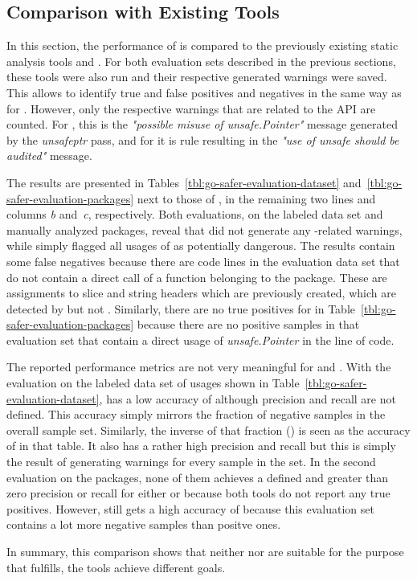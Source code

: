 
\subsection{Comparison with Existing Tools}\label{subsec:go-safer:evaluation:linters-comparison}

In this section, the performance of \toolSafer{} is compared to the previously existing static analysis tools \toolVet{}
and \toolGosec{}.
For both evaluation sets described in the previous sections, these tools were also run and their respective generated
warnings were saved.
This allows to identify true and false positives and negatives in the same way as for \toolSafer{}.
However, only the respective warnings that are related to the \unsafe{} \acrshort{API} are counted.
For \toolVet{}, this is the \textit{"possible misuse of unsafe.Pointer"} message generated by the \textit{unsafeptr}
pass, and for \toolGosec{} it is rule  resulting in the \textit{"use of unsafe should be
audited"} message.

The results are presented in Tables~\ref{tbl:go-safer-evaluation-dataset} and~\ref{tbl:go-safer-evaluation-packages}
next to those of \toolSafer{}, in the remaining two lines and columns \textit{b} and~\textit{c}, respectively.
Both evaluations, on the labeled data set and  manually analyzed packages, reveal that \toolVet{} did not
generate any \unsafe{}-related warnings, while \toolGosec{} simply flagged all usages of \unsafe{} as potentially
dangerous.
The \toolGosec{} results contain some false negatives because there are code lines in the evaluation data set that do
not contain a direct call of a function belonging to the \unsafe{} package.
These are assignments to slice and string headers which are previously created, which are detected by \toolSafer{} but
not \toolGosec{}.
Similarly, there are no true positives for \toolGosec{} in Table~\ref{tbl:go-safer-evaluation-packages} because there
are no positive samples in that evaluation set that contain a direct usage of \textit{unsafe.Pointer} in the line of
code.

The reported performance metrics are not very meaningful for \toolVet{} and \toolGosec{}.
With the evaluation on the labeled data set of \unsafe{} usages shown in Table~\ref{tbl:go-safer-evaluation-dataset},
\toolVet{} has a low accuracy of  although precision and recall are not defined.
This accuracy simply mirrors the fraction of negative samples in the overall sample set.
Similarly, the inverse of that fraction () is seen as the accuracy of \toolGosec{} in that table.
It also has a rather high precision and recall but this is simply the result of generating warnings for every sample in
the set.
In the second evaluation on the  packages, none of them achieves a defined and greater than zero precision
or recall for either \toolVet{} or \toolGosec{} because both tools do not report any true positives.
However, \toolVet{} still gets a high accuracy of  because this evaluation set contains a lot more
negative samples than positve ones.

In summary, this comparison shows that neither \toolVet{} nor \toolGosec{} are suitable for the purpose that
\toolSafer{} fulfills, the tools achieve different goals.
